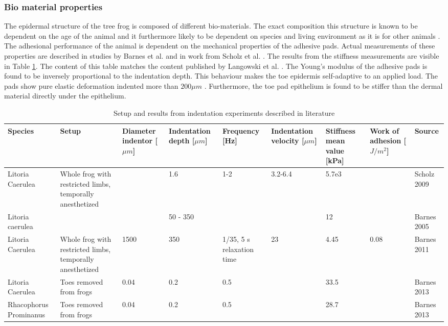 \subsubsection{Bio material properties}\label{sec:bio_material_properties}
The epidermal structure of the tree frog is composed of different bio-materials. The exact composition this structure is known to be dependent on the age of the animal \cite{barnes2011elastic} and it furthermore likely to be dependent on species and living environment as it is for other animals \cite{peng2016microstructure}. The adhesional performance of the animal is dependent on the mechanical properties of the adhesive pads. Actual measurements of these properties are described in studies by Barnes et al. and in work from Scholz et al. \cite{barnes2005mechanical,scholz2009ultrastructure,barnes2011elastic,barnes2013comparative,kappl2016nanoscale}. The results from the stiffness measurements are visible in Table \ref{tab:experiments_literature}. The content of this table matches the content published by Langowski et al. \cite{langowski2018tree}. The Young's modulus of the adhesive pads is found to be inversely proportional to the indentation depth. This behaviour makes the toe epidermis self-adaptive to an applied load. The pads show pure elastic deformation indented more than $200 \mu m$ \cite{barnes2011elastic}. Furthermore, the toe pad epithelium is found to be stiffer than the dermal material directly under the epithelium. 


\begin{table}[h!]
\hspace*{-1cm}\begin{tabular}{p{2cm}|p{2cm}|p{1.5cm}|p{1.5cm}|p{1.5cm}|p{1.5cm}|p{1.5cm}|p{1.5cm}|p{2cm}}
Species & Setup & Diameter indentor [$\mu m$] & Indentation depth [$\mu m$]  & Frequency [Hz] & Indentation velocity [$\mu m$] & Stiffness mean value [kPa] & Work of adhesion [$J/m^2$] & Source\\ 
\hline
Litoria Caerulea & Whole frog with restricted limbs, temporally anesthetized & & 1.6 & 1-2 & 3.2-6.4 & 5.7e3 & & Scholz 2009\\
\hline
Litoria caerulea & & & 50 - 350 & & & 12 & & Barnes 2005\\
\hline
Litoria Caerulea & Whole frog with restricted limbs, temporally anesthetized & 1500 & 350 & 1/35, 5 s relaxation time & 23 & 4.45 & 0.08 & Barnes 2011 \\
\hline
Litoria Caerulea & Toes removed from frogs & 0.04 & 0.2 & 0.5 & & 33.5& & Barnes 2013\\
\hline
Rhacophorus Prominanus & Toes removed from frogs & 0.04 & 0.2 & 0.5 & & 28.7 &  & Barnes 2013  
\end{tabular}\hspace*{-1cm}
\caption{Setup and results from indentation experiments described in literature}
\label{tab:experiments_literature}
\end{table}


